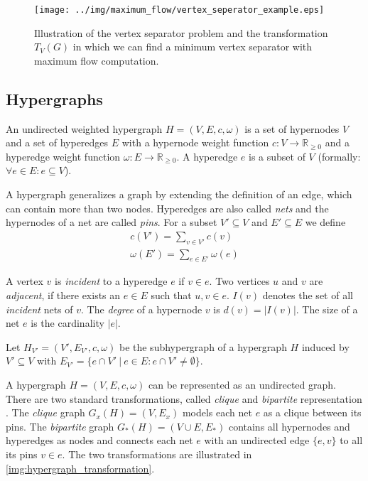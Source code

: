 \begin{figure}
\centering
\texttt{[image: ../img/maximum\_flow/vertex\_seperator\_example.eps]}
\caption{ Illustration of the vertex separator problem and the transformation $T_V(G)$ in which
          we can find a minimum vertex separator with maximum flow computation. }
\label{img:vertex_seperator_example}
\end{figure}

\subsection{Hypergraphs}
\label{sec:hypergraph}

\begin{definition}
An undirected weighted hypergraph $H = (V,E,c,\omega)$ is a set of hypernodes $V$ 
and a set of hyperedges $E$ with a hypernode weight function 
$c: V \rightarrow \mathbb{R}_{\ge 0}$ and a hyperedge weight 
function $\omega: E \rightarrow \mathbb{R}_{\ge 0}$. A hyperedge $e$ 
is a subset of $V$ (formally: $\forall e \in E: e \subseteq V$).
\label{def:hypergraph}
\end{definition}

A hypergraph generalizes a graph by extending the definition of an edge, which 
can contain more than two nodes. Hyperedges are also called \emph{nets} and the hypernodes
of a net are called \emph{pins}. For a subset $V' \subseteq V$ and $E' \subseteq E$ we
define
\begin{align*}
c(V') = \sum_{v \in V'} c(v) \\
\omega(E') = \sum_{e \in E'} \omega(e)
\end{align*}

A vertex $v$ is \emph{incident} to a hyperedge $e$ if $v \in e$.
Two vertices $u$ and $v$ are \emph{adjacent}, if there exists an 
$e \in E$ such that $u,v \in e$. $I(v)$ denotes the set of all 
\emph{incident} nets of $v$. The \emph{degree} of a hypernode 
$v$ is $d(v) = |I(v)|$. The size of a net $e$ is the cardinality $|e|$.

\begin{definition}
Let $H_{V'} = (V',E_{V'},c,\omega)$ be the subhypergraph of a hypergraph $H$
induced by $V' \subseteq V$ with $E_{V'} = \{e \cap V'\ |\ e \in E: e 
\cap V' \neq \emptyset\}$.
\label{def:subhypergraph}
\end{definition}

A hypergraph $H = (V,E,c,\omega)$ can be represented as an undirected graph. 
There are two standard transformations, called \emph{clique} and \emph{bipartite} 
representation \cite{HuMoerder85}. The \emph{clique} graph $G_x(H) = (V,E_x)$ models
each net $e$ as a clique between its pins. The \emph{bipartite} graph $G_*(H) = 
(V \cup E, E_*)$ contains all hypernodes and hyperedges as nodes and connects each
net $e$ with an undirected edge $\{e,v\}$ to all its pins $v \in e$. The two transformations
are illustrated in \autoref{img:hypergraph_transformation}.

